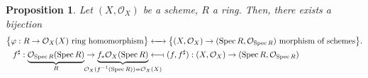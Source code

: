 \documentclass[12pt]{article}
\DeclareMathOperator{\Spec}{Spec}
\newtheorem*{proposition}{Proposition}
\theoremstyle{definition}
\theoremstyle{remark}
\begin{document}
\begin{proposition}
Let $(X,\mathcal{O}_X)$ be a scheme, $R$ a ring. Then, there exists a bijection
\begin{align*}
\big\{\varphi:R\rightarrow\mathcal{O}_X(X)\text{ ring homomorphism}\big\}&\xleftrightarrow{\hspace{4.4mm}}\big\{(X,\mathcal{O}_X)\rightarrow(\Spec R,\mathcal{O}_{\Spec R})\text{ morphism of schemes}\big\}.\\
f^{\sharp}:\underbrace{\mathcal{O}_{\Spec R}(\Spec R)}_R\rightarrow\underbrace{f_*\mathcal{O}_X(\Spec R)}_{\mathclap{\mathcal{O}_X(f^{-1}(\Spec R))=\mathcal{O}_X(X)}}&\longleftarrow\!\shortmid(f,f^{\sharp}):(X,\mathcal{O}_X)\rightarrow(\Spec R,\mathcal{O}_{\Spec R})
\end{align*}
\end{proposition}
\end{document}
